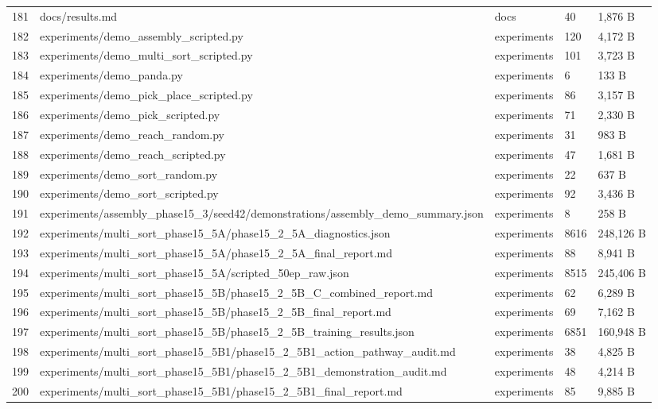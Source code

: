\documentclass[11pt,a4paper,oneside]{book}
\begin{document}
\begin{longtable}{l l l l l}
181 & docs/results.md & docs & 40 & 1,876 B \\
182 & experiments/demo\_assembly\_scripted.py & experiments & 120 & 4,172 B \\
183 & experiments/demo\_multi\_sort\_scripted.py & experiments & 101 & 3,723 B \\
184 & experiments/demo\_panda.py & experiments & 6 & 133 B \\
185 & experiments/demo\_pick\_place\_scripted.py & experiments & 86 & 3,157 B \\
186 & experiments/demo\_pick\_scripted.py & experiments & 71 & 2,330 B \\
187 & experiments/demo\_reach\_random.py & experiments & 31 & 983 B \\
188 & experiments/demo\_reach\_scripted.py & experiments & 47 & 1,681 B \\
189 & experiments/demo\_sort\_random.py & experiments & 22 & 637 B \\
190 & experiments/demo\_sort\_scripted.py & experiments & 92 & 3,436 B \\
191 & experiments/assembly\_phase15\_3/seed42/demonstrations/assembly\_demo\_summary.json & experiments & 8 & 258 B \\
192 & experiments/multi\_sort\_phase15\_5A/phase15\_2\_5A\_diagnostics.json & experiments & 8616 & 248,126 B \\
193 & experiments/multi\_sort\_phase15\_5A/phase15\_2\_5A\_final\_report.md & experiments & 88 & 8,941 B \\
194 & experiments/multi\_sort\_phase15\_5A/scripted\_50ep\_raw.json & experiments & 8515 & 245,406 B \\
195 & experiments/multi\_sort\_phase15\_5B/phase15\_2\_5B\_C\_combined\_report.md & experiments & 62 & 6,289 B \\
196 & experiments/multi\_sort\_phase15\_5B/phase15\_2\_5B\_final\_report.md & experiments & 69 & 7,162 B \\
197 & experiments/multi\_sort\_phase15\_5B/phase15\_2\_5B\_training\_results.json & experiments & 6851 & 160,948 B \\
198 & experiments/multi\_sort\_phase15\_5B1/phase15\_2\_5B1\_action\_pathway\_audit.md & experiments & 38 & 4,825 B \\
199 & experiments/multi\_sort\_phase15\_5B1/phase15\_2\_5B1\_demonstration\_audit.md & experiments & 48 & 4,214 B \\
200 & experiments/multi\_sort\_phase15\_5B1/phase15\_2\_5B1\_final\_report.md & experiments & 85 & 9,885 B \\

\end{longtable}
\end{document}
